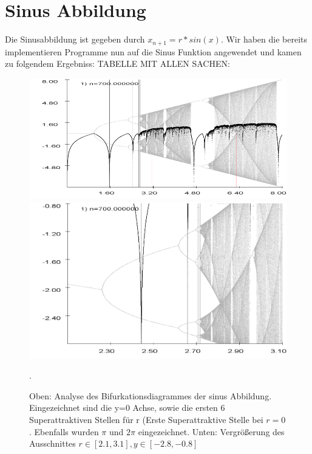 \documentclass{scrartcl}
\begin{document}
\section{Sinus Abbildung}
Die Sinusabbildung ist gegeben durch $x_{n+1}=r*sin(x)$. Wir haben die bereits implementieren Programme nun auf die Sinus Funktion angewendet und kamen zu folgendem Ergebniss:
 TABELLE MIT ALLEN SACHEN:

\begin{figure}
\centering
\includegraphics[scale=0.55]{bifurkation-sin}
\includegraphics[scale=0.47]{bifurkation-sin-zoom}
\caption{Oben: Analyse des Bifurkationsdiagrammes der sinus Abbildung. Eingezeichnet sind die y=0 Achse, sowie die ersten 6 Superattraktiven Stellen für r (Erste Superattraktive Stelle bei $r=0$. Ebenfalls wurden $\pi$ und $2\pi$ eingezeichnet. Unten: Vergrößerung des Ausschnittes $r \in [2.1,3.1], y\in[-2.8,-0.8]$}. 
\end{figure}
\end{document}

